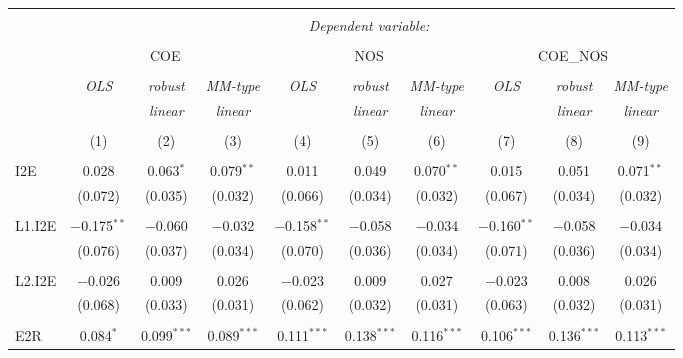
\begin{table}[!htbp] \centering 
  \caption{} 
  \label{} 
\begin{tabular}{@{\extracolsep{5pt}}lccccccccc} 
\\[-1.8ex]\hline 
\hline \\[-1.8ex] 
 & \multicolumn{9}{c}{\textit{Dependent variable:}} \\ 
\cline{2-10} 
\\[-1.8ex] & \multicolumn{3}{c}{COE} & \multicolumn{3}{c}{NOS} & \multicolumn{3}{c}{COE\_NOS} \\ 
\\[-1.8ex] & \textit{OLS} & \textit{robust} & \textit{MM-type} & \textit{OLS} & \textit{robust} & \textit{MM-type} & \textit{OLS} & \textit{robust} & \textit{MM-type} \\ 
 & \textit{} & \textit{linear} & \textit{linear} & \textit{} & \textit{linear} & \textit{linear} & \textit{} & \textit{linear} & \textit{linear} \\ 
\\[-1.8ex] & (1) & (2) & (3) & (4) & (5) & (6) & (7) & (8) & (9)\\ 
\hline \\[-1.8ex] 
 I2E & 0.028 & 0.063$^{*}$ & 0.079$^{**}$ & 0.011 & 0.049 & 0.070$^{**}$ & 0.015 & 0.051 & 0.071$^{**}$ \\ 
  & (0.072) & (0.035) & (0.032) & (0.066) & (0.034) & (0.032) & (0.067) & (0.034) & (0.032) \\ 
  & & & & & & & & & \\ 
 L1.I2E & $-$0.175$^{**}$ & $-$0.060 & $-$0.032 & $-$0.158$^{**}$ & $-$0.058 & $-$0.034 & $-$0.160$^{**}$ & $-$0.058 & $-$0.034 \\ 
  & (0.076) & (0.037) & (0.034) & (0.070) & (0.036) & (0.034) & (0.071) & (0.036) & (0.034) \\ 
  & & & & & & & & & \\ 
 L2.I2E & $-$0.026 & 0.009 & 0.026 & $-$0.023 & 0.009 & 0.027 & $-$0.023 & 0.008 & 0.026 \\ 
  & (0.068) & (0.033) & (0.031) & (0.062) & (0.032) & (0.031) & (0.063) & (0.032) & (0.031) \\ 
  & & & & & & & & & \\ 
 E2R & 0.084$^{*}$ & 0.099$^{***}$ & 0.089$^{***}$ & 0.111$^{***}$ & 0.138$^{***}$ & 0.116$^{***}$ & 0.106$^{***}$ & 0.136$^{***}$ & 0.113$^{***}$ \\ 

\end{tabular}
\end{table}
